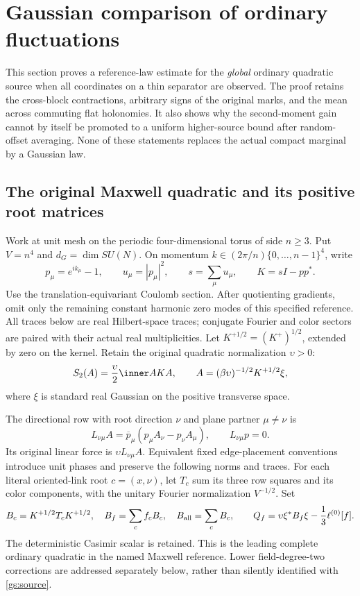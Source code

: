 \section{Gaussian comparison of ordinary fluctuations}
\label{gs:section}

This section proves a reference-law estimate for the \emph{global} ordinary
quadratic source when all coordinates on a thin separator are observed. The
proof retains the cross-block contractions, arbitrary signs of the original
marks, and the mean across commuting flat holonomies. It also shows why the
second-moment gain cannot by itself be promoted to a uniform higher-source
bound after random-offset averaging. None of these statements replaces the
actual compact marginal by a Gaussian law.

\subsection{The original Maxwell quadratic and its positive root matrices}

Work at unit mesh on the periodic four-dimensional torus of side \(n\ge3\).
Put \(V=n^4\) and \(d_G=\dim SU(N)\). On momentum
\(k\in(2\pi/n)\{0,\ldots,n-1\}^4\), write
\[
 p_\mu=e^{ik_\mu}-1,\qquad u_\mu=|p_\mu|^2,\qquad
 s=\sum_\mu u_\mu,\qquad K=sI-pp^*.
\]
Use the translation-equivariant Coulomb section. After quotienting gradients,
omit only the remaining constant harmonic zero modes of this specified
reference. All traces below are real Hilbert-space traces; conjugate Fourier
and color sectors are paired with their actual real multiplicities.
Let \(K^{+1/2}=(K^+)^{1/2}\), extended by zero on the kernel. Retain the original
quadratic normalization \(\upsilon>0\):
\begin{equation}
 S_2(A)=\frac{\upsilon}{2}\inner A{KA},\qquad
 A=(\beta\upsilon)^{-1/2}K^{+1/2}\xi,
 \label{gs:reference}
\end{equation}
where \(\xi\) is standard real Gaussian on the positive transverse space.

The directional row with root direction \(\nu\) and plane partner \(\mu\ne\nu\)
is
\[
 L_{\nu\mu}A=\overline p_\mu(p_\mu A_\nu-p_\nu A_\mu),
 \qquad L_{\nu\mu}p=0.
\]
Its original linear force is \(\upsilon L_{\nu\mu}A\). Equivalent fixed
edge-placement conventions introduce unit phases and preserve the following
norms and traces. For each literal oriented-link root \(c=(x,\nu)\), let
\(T_c\) sum its three row squares and its color components, with the unitary
Fourier normalization \(V^{-1/2}\). Set
\begin{equation}
 B_c=K^{+1/2}T_cK^{+1/2},\quad B_f=\sum_cf_cB_c,\quad
 B_{\rm all}=\sum_cB_c,\qquad
 Q_f=\upsilon\xi^*B_f\xi-\frac13\ell^{(0)}[f].
 \label{gs:source}
\end{equation}
The deterministic Casimir scalar is retained. This is the leading complete
ordinary quadratic in the named Maxwell reference. Lower field-degree-two
corrections are addressed separately below, rather than silently identified
with \eqref{gs:source}.

